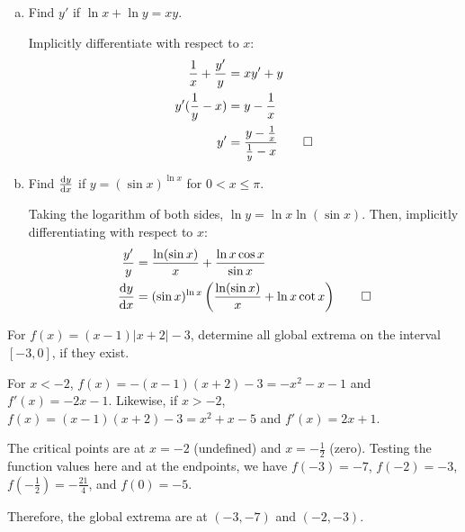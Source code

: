 \documentclass{agony}
\begin{document}
\begin{prob}
  \begin{enumerate}[(a)]
    \item Find $y'$ if $\ln x + \ln y = xy$.
          \begin{sol}
            Implicitly differentiate with respect to $x$: \begin{align*}
              \frac{1}{x} + \frac{y'}{y} & = xy' + y                                      \\
              y'(\frac{1}{y} - x)        & = y - \frac{1}{x}                              \\
              y'                         & = \frac{y-\frac{1}{x}}{\frac{1}{y}-x} \qedhere
            \end{align*}
          \end{sol}
    \item Find $\dv{y}{x}$ if $y = (\sin x)^{\ln x}$ for $0 < x \leq \pi$.
          \begin{sol}
            Taking the logarithm of both sides, $\ln y = \ln x \ln(\sin x)$.
            Then, implicitly differentiating with respect to $x$: \begin{align*}
              \frac{y'}{y} & = \frac{\ln(\sin x)}{x} + \frac{\ln x \cos x}{\sin x}                        \\
              \dv{y}{x}         & = (\sin x)^{\ln x}\left(\frac{\ln(\sin x)}{x} + \ln x \cot x\right) \qedhere
            \end{align*}
          \end{sol}
  \end{enumerate}
\end{prob}

\begin{prob}
  For $f(x) = (x-1)|x+2| - 3$, determine all global extrema on the interval $[-3,0]$, if they exist.
\end{prob}
\begin{sol}
  For $x < -2$, $f(x) = -(x-1)(x+2) - 3 = - x^2 - x - 1$ and $f'(x) = -2x - 1$.
  Likewise, if $x > -2$, $f(x) = (x-1)(x+2) - 3 = x^2 + x - 5$ and $f'(x) = 2x + 1$.

  The critical points are at $x = -2$ (undefined) and $x = -\frac12$ (zero).
  Testing the function values here and at the endpoints, we have
  $f(-3) = -7$, $f(-2) = -3$, $f(-\frac12) = -\frac{21}{4}$, and $f(0) = -5$.

  Therefore, the global extrema are at $(-3, -7)$ and $(-2, -3)$.
\end{sol}
\end{document}
